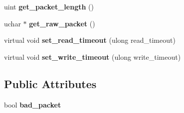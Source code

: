 \begin{DoxyCompactItemize}
uint {\bfseries get\+\_\+packet\+\_\+length} ()
\item 
\mbox{\label{classProtocol__classic_a336927e8428cd2381ba3b3147100b51d}} 
uchar $\ast$ {\bfseries get\+\_\+raw\+\_\+packet} ()
\item 
\mbox{\label{classProtocol__classic_a33eb76bf78ad17f390f2e786e1cb7435}} 
virtual void {\bfseries set\+\_\+read\+\_\+timeout} (ulong read\+\_\+timeout)
\item 
\mbox{\label{classProtocol__classic_a265d5109a26a1174e7e382880c40f6b9}} 
virtual void {\bfseries set\+\_\+write\+\_\+timeout} (ulong write\+\_\+timeout)
\end{DoxyCompactItemize}
\subsection*{Public Attributes}
\begin{DoxyCompactItemize}
\item 
\mbox{\label{classProtocol__classic_af99254cef4b9016ef028fe526555b441}} 
bool {\bfseries bad\+\_\+packet}
\end{DoxyCompactItemize}
